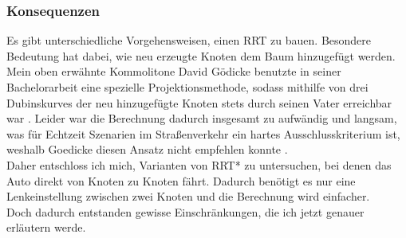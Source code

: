 \subsubsection{Konsequenzen}
Es gibt unterschiedliche Vorgehensweisen, einen RRT zu bauen. Besondere Bedeutung hat dabei, wie neu erzeugte Knoten dem Baum hinzugefügt werden. Mein oben erwähnte Kommolitone David Gödicke benutzte in seiner Bachelorarbeit eine spezielle Projektionsmethode, sodass mithilfe von drei Dubinskurves \citep{Dubin61} der neu hinzugefügte Knoten stets durch seinen Vater erreichbar war \citep{Goedicke18}. Leider war die Berechnung dadurch insgesamt zu aufwändig und langsam, was für Echtzeit Szenarien im Straßenverkehr ein hartes Ausschlusskriterium ist, weshalb Goedicke diesen Ansatz nicht empfehlen konnte \citep[vergleiche][Kapitel 7]{Goedicke18}. \\
Daher entschloss ich mich, Varianten von RRT* zu untersuchen, bei denen das Auto direkt von Knoten zu Knoten fährt. Dadurch benötigt es nur eine Lenkeinstellung zwischen zwei Knoten und die Berechnung wird einfacher.\\
Doch dadurch entstanden gewisse Einschränkungen, die ich jetzt genauer erläutern werde.\\
